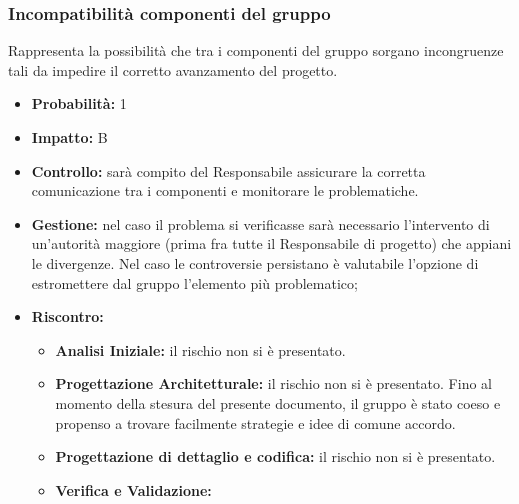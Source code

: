 \documentclass[a4paper,11pt]{article}
\begin{document}
		\subsubsection{Incompatibilità componenti del gruppo}
		Rappresenta la possibilità che tra i componenti del gruppo sorgano incongruenze tali da impedire il corretto avanzamento del progetto.
		\begin{itemize}
		\item \textbf{Probabilità:} 1
		\item \textbf{Impatto:} B
		\item \textbf{Controllo:} sarà compito del Responsabile assicurare la corretta comunicazione tra i componenti e monitorare le problematiche.
		\item \textbf{Gestione:} nel caso il problema si verificasse sarà necessario l'intervento di un'autorità maggiore (prima fra tutte il Responsabile di progetto) che appiani le divergenze. Nel caso le controversie persistano è valutabile l'opzione di estromettere dal gruppo l'elemento più problematico;
		\item \textbf{Riscontro:}
			\begin{itemize}
				\item\textbf{Analisi Iniziale:} il rischio non si è presentato.
				\item\textbf{Progettazione Architetturale:} il rischio non si è presentato. Fino al momento della stesura del presente documento, il gruppo è stato coeso e propenso a trovare facilmente strategie e idee di comune accordo.
				\item\textbf{Progettazione di dettaglio e codifica:} il rischio non si è presentato. 
				\item\textbf{Verifica e Validazione:}
			\end{itemize}
		\end{itemize}
\end{document}
